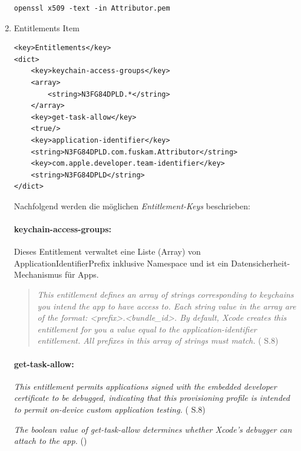\begin{enumerate}
\lstset{
    language=bash,
    }
\begin{lstlisting}[captionpos=b, caption={Befehl: openssl -- (siehe Abb. \ref{fig:DeveloperCertificates})}]
openssl x509 -text -in Attributor.pem 
\end{lstlisting}
\newpage
    \item Entitlements Item
\begin{lstlisting}[captionpos=b, caption={Entitlements Item}]
<key>Entitlements</key>
<dict>
    <key>keychain-access-groups</key>
    <array>
        <string>N3FG84DPLD.*</string>           
    </array>
    <key>get-task-allow</key>
    <true/>
    <key>application-identifier</key>
    <string>N3FG84DPLD.com.fuskam.Attributor</string>
    <key>com.apple.developer.team-identifier</key>
    <string>N3FG84DPLD</string>
</dict>
\end{lstlisting}

Nachfolgend werden die möglichen \textit{\glqq Entitlement-Keys\grqq{}} beschrieben:

\paragraph{keychain-access-groups:}
Dieses Entitlement verwaltet eine Liste (Array) von ApplicationIdentifierPrefix inklusive Namespace und ist ein Datensicherheit-Mechanismus für Apps. \par 
 \begin{quote}
     \glqq \textit{This entitlement defines an array of strings corresponding to keychains you intend the app to have access to. Each string value in the array are of the format: <prefix>.<bundle\_id>. By default, Xcode creates this entitlement for you a value equal to the application-identifier entitlement. All prefixes in this array of strings must match.}\grqq{} (\cite{iOSSec[5]} S.8)
 \end{quote}
    
\paragraph{get-task-allow:} 
\glqq\textit{This entitlement permits applications signed with the embedded developer certificate to be debugged, indicating that this provisioning profile is intended to permit on-device custom application testing.}\grqq{} (\cite{iOSSec[5]} S.8) \par 
    \glqq \textit{The boolean value of get-task-allow determines whether Xcode's debugger can attach to the app.}\grqq{} (\cite{ProvisioningProfile[3]})


\end{enumerate}
